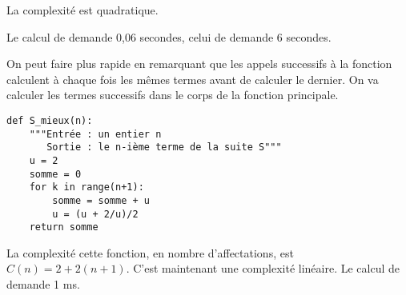 La complexité est quadratique. 

Le calcul de  demande 0,06 secondes, celui de  demande 6 secondes.

\medskip

On peut faire plus rapide en remarquant que les appels successifs à la fonction  calculent à chaque fois les mêmes termes avant de calculer le dernier. On va calculer les termes successifs dans le corps de la fonction principale.
\begin{lstlisting}
def S_mieux(n):
    """Entrée : un entier n
       Sortie : le n-ième terme de la suite S"""
    u = 2
    somme = 0
    for k in range(n+1):
        somme = somme + u
        u = (u + 2/u)/2
    return somme
\end{lstlisting}
La complexité cette fonction, en nombre d'affectations, est $C(n) = 2  + 2(n+1)$. C'est maintenant une complexité linéaire. Le calcul de  demande 1 ms.

